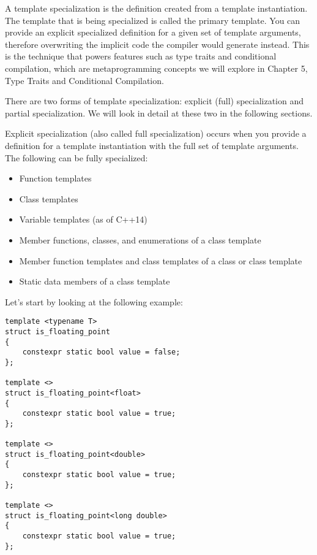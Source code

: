 
A template specialization is the definition created from a template instantiation. The template that is being specialized is called the primary template. You can provide an explicit specialized definition for a given set of template arguments, therefore overwriting the implicit code the compiler would generate instead. This is the technique that powers features such as type traits and conditional compilation, which are metaprogramming concepts we will explore in Chapter 5, Type Traits and Conditional Compilation.

There are two forms of template specialization: explicit (full) specialization and partial specialization. We will look in detail at these two in the following sections.


Explicit specialization (also called full specialization) occurs when you provide a definition for a template instantiation with the full set of template arguments. The following can be fully specialized:

\begin{itemize}
\item 
Function templates

\item 
Class templates

\item 
Variable templates (as of C++14)

\item 
Member functions, classes, and enumerations of a class template

\item 
Member function templates and class templates of a class or class template

\item 
Static data members of a class template
\end{itemize}

Let's start by looking at the following example:

\begin{lstlisting}[style=styleCXX]
template <typename T>
struct is_floating_point
{
	constexpr static bool value = false;
};

template <>
struct is_floating_point<float>
{
	constexpr static bool value = true;
};

template <>
struct is_floating_point<double>
{
	constexpr static bool value = true;
};

template <>
struct is_floating_point<long double>
{
	constexpr static bool value = true;
};
\end{lstlisting}

